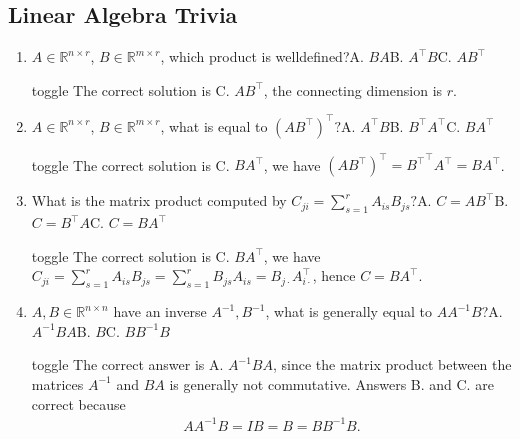 \documentclass[letterpaper,10pt,english]{jupyterBook}
\begin{document}
\subsection{Linear Algebra Trivia}
\label{\detokenize{linalg_exercises:linear-algebra-trivia}}\begin{enumerate}
%
\item {} 
\sphinxAtStartPar
\(A\in\mathbb{R}^{n\times r}\), \(B\in\mathbb{R}^{m\times r}\), which product is well\sphinxhyphen{}defined?A.  \(BA\)B.  \(A^\top B\)C.  \(AB^\top\)

\begin{sphinxuseclass}{toggle}
\sphinxAtStartPar
The correct solution is C. \(AB^\top\), the connecting dimension is \(r\).

\end{sphinxuseclass}
\item {} 
\sphinxAtStartPar
\(A\in\mathbb{R}^{n\times r}\), \(B\in\mathbb{R}^{m\times r}\), what is equal to \((AB^\top)^\top ?\)A. \(A^\top B\)B. \(B^\top A^\top\)C. \(BA^\top\)

\begin{sphinxuseclass}{toggle}
\sphinxAtStartPar
The correct solution is C. \(BA^\top\), we have \((AB^\top)^\top = {B^\top}^\top A^\top = BA^\top\).

\end{sphinxuseclass}
\item {} 
\sphinxAtStartPar
What is the matrix product computed by \(C_{ji}=\sum_{s=1}^rA_{is}B_{js} ?\)A. \(C=AB^\top\)B. \(C=B^\top A\)C. \(C=BA^\top\)

\begin{sphinxuseclass}{toggle}
\sphinxAtStartPar
The correct solution is C. \(BA^\top\), we have
\(C_{ji}=\sum_{s=1}^rA_{is}B_{js} = \sum_{s=1}^rB_{js}A_{is} = B_{j\cdot}A_{i\cdot}^\top\), hence \(C=BA^\top\).

\end{sphinxuseclass}
\item {} 
\sphinxAtStartPar
\(A,B\in\mathbb{R}^{n\times n}\) have an inverse \(A^{-1},B^{-1}\), what is generally  equal to \(AA^{-1}B\)?A. \(A^{-1}BA\)B. \(B\)C. \(BB^{-1}B\)

\begin{sphinxuseclass}{toggle}
\sphinxAtStartPar
The correct answer is A. \(A^{-1}BA\), since the matrix product between the matrices \(A^{-1}\) and \(BA\) is generally not commutative. Answers B. and C. are correct because
\begin{equation*}
\begin{split}AA^{-1}B = IB =B = BB^{-1}B.\end{split}
\end{equation*}


\end{sphinxuseclass}
\end{enumerate}
\end{document}
